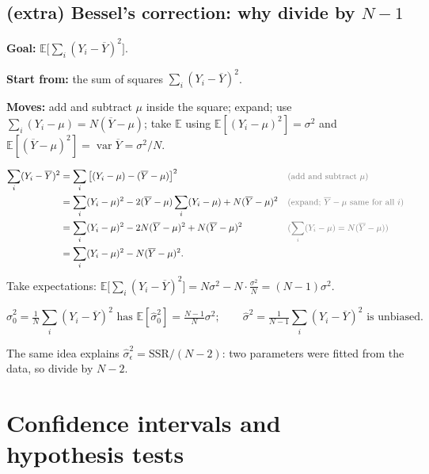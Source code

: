 \documentclass[11pt]{article}
\newcommand{\E}{\mathbb{E}}
\newcommand{\Var}{\operatorname{var}}
\newcommand{\SSR}{\mathrm{SSR}}
\newcommand{\Ybar}{\overline{Y}}
\newcommand{\why}[1]{&&\text{\small\color{gray}(#1)}}
\newcommand{\mv}[1]{\tcbox[on line, colback=methodclr, colframe=methodclr, coltext=white, boxsep=0pt,
  left=2pt, right=2pt, top=1pt, bottom=1pt, arc=1.5pt]{\sffamily\scriptsize\bfseries M#1}}
\newcommand{\goal}[1]{\textbf{Goal:} #1\par}
\newcommand{\start}[1]{\textbf{Start from:} #1\par}
\newcommand{\moves}[1]{\textbf{Moves:} #1\par}
\begin{document}
\subsection{(extra) Bessel's correction: why divide by $N-1$}\label{sec:bessel}
\begin{methodbox}
\goal{$\E\big[\sum_i(Y_i-\Ybar)^2\big]$.}
\start{the sum of squares $\sum_i(Y_i-\Ybar)^2$.}
\moves{\mv{10} add and subtract $\mu$ inside the square; expand; use $\sum_i(Y_i-\mu)=N(\Ybar-\mu)$; take $\E$ using
$\E[(Y_i-\mu)^2]=\sigma^2$ and $\E[(\Ybar-\mu)^2]=\Var\Ybar=\sigma^2/N$.}
\end{methodbox}
\begin{align*}
\sum_i(Y_i-\Ybar)^2&=\sum_i\big[(Y_i-\mu)-(\Ybar-\mu)\big]^2 \why{add and subtract $\mu$}\\
&=\sum_i(Y_i-\mu)^2-2(\Ybar-\mu)\sum_i(Y_i-\mu)+N(\Ybar-\mu)^2 \why{expand; $\Ybar-\mu$ same for all $i$}\\
&=\sum_i(Y_i-\mu)^2-2N(\Ybar-\mu)^2+N(\Ybar-\mu)^2 \why{$\sum_i(Y_i-\mu)=N(\Ybar-\mu)$}\\
&=\sum_i(Y_i-\mu)^2-N(\Ybar-\mu)^2 .
\end{align*}
Take expectations: $\E\big[\sum_i(Y_i-\Ybar)^2\big]=N\sigma^2-N\cdot\frac{\sigma^2}{N}=(N-1)\sigma^2$.
\begin{keybox}
\[\hat\sigma_0^2=\tfrac1N\textstyle\sum_i(Y_i-\Ybar)^2\text{ has }\E[\hat\sigma_0^2]=\tfrac{N-1}{N}\sigma^2;\qquad
\hat\sigma^2=\tfrac{1}{N-1}\textstyle\sum_i(Y_i-\Ybar)^2\text{ is unbiased.}\]
\end{keybox}
The same idea explains $\hat\sigma_\epsilon^2=\SSR/(N-2)$: two parameters were fitted from the data, so divide by $N-2$.

\clearpage
\section{Confidence intervals and hypothesis tests}\label{sec:citest}
\end{document}
